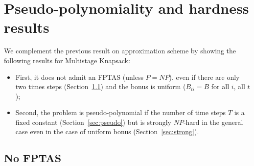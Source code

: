 \documentclass[a4paper]{book}
\begin{document}

\section{Pseudo-polynomiality and hardness results}

We complement the previous result on approximation scheme by showing the following results for {\sc Multistage  Knapsack}:
\begin{itemize}
\item First, it does not admit an FPTAS (unless $P=NP$), even if there are only two times steps (Section~\ref{sec:nofptas}) and the bonus is uniform ($B_{ti}=B$ for all $i$, all $t$);
\item Second, the problem is pseudo-polynomial if the number of time steps $T$ is a fixed constant (Section~\ref{sec:pseudo}) but is strongly $NP$-hard in the general case even in the case of uniform bonus (Section~\ref{sec:strong}). 
\end{itemize}


\subsection{No FPTAS}\label{sec:nofptas}
\end{document}
